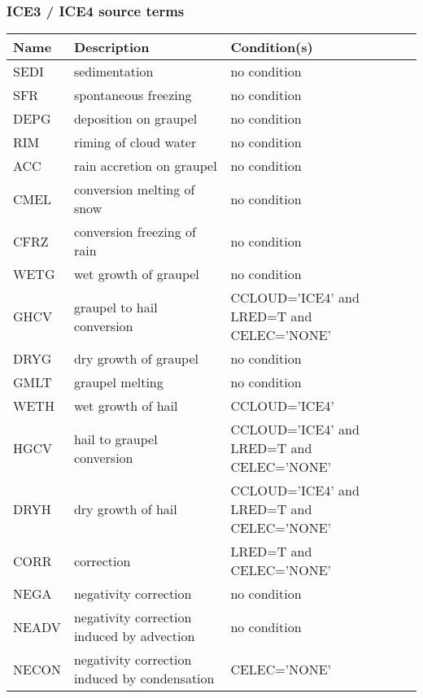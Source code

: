 \subsubsection{ICE3 / ICE4 source terms}

\begin{longtable} {|p{}|p{}|p{}|}
\hline
Name & Description & Condition(s) \\
\hline \hline
\endhead
SEDI   & sedimentation                                 & no condition \\\hline
SFR    & spontaneous freezing                          & no condition \\\hline
DEPG   & deposition on graupel                         & no condition \\\hline
RIM    & riming of cloud water                         & no condition \\\hline
ACC    & rain accretion on graupel                     & no condition \\\hline
CMEL   & conversion melting of snow                    & no condition \\\hline
CFRZ   & conversion freezing of rain                   & no condition \\\hline
WETG   & wet growth of graupel                         & no condition \\\hline
GHCV   & graupel to hail conversion                    & CCLOUD='ICE4' and LRED=T and CELEC='NONE' \\\hline
DRYG   & dry growth of graupel                         & no condition \\\hline
GMLT   & graupel melting                               & no condition \\\hline
WETH   & wet growth of hail                            & CCLOUD='ICE4' \\\hline
HGCV   & hail to graupel conversion                    & CCLOUD='ICE4' and LRED=T and CELEC='NONE' \\\hline
DRYH   & dry growth of hail                            & CCLOUD='ICE4' and LRED=T and CELEC='NONE' \\\hline
CORR   & correction                                    & LRED=T and CELEC='NONE' \\\hline
NEGA   & negativity correction                         & no condition \\\hline
NEADV  & negativity correction induced by advection    & no condition \\\hline
NECON  & negativity correction induced by condensation & CELEC='NONE' \\\hline
\end{longtable}


